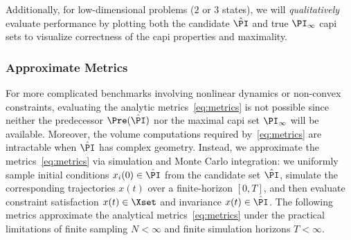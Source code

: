Additionally, for low-dimensional problems ($2$ or $3$ states), we will \textit{qualitatively} evaluate performance by plotting both the candidate $\hat{\PI}$ and true $\PI_\infty$ \ac{capi} sets to visualize correctness of the \ac{capi} properties and maximality. 

\subsubsection{Approximate Metrics}

For more complicated benchmarks involving nonlinear dynamics or non-convex constraints, evaluating the analytic metrics~\eqref{eq:metrics} is not possible since neither the predecessor $\Pre(\hat{\PI})$ nor the maximal \ac{capi} set $\PI_\infty$ will be available. Moreover, the volume computations required by~\eqref{eq:metrics} are intractable when $\hat{\PI}$ has complex geometry. Instead, we approximate the metrics~\eqref{eq:metrics} via simulation and Monte Carlo integration: we uniformly sample initial conditions $x_i(0) \in \hat{\PI}$ from the candidate set $\hat{\PI}$, simulate the corresponding trajectories $x(t)$ over a finite-horizon $[0,T]$, and then evaluate constraint satisfaction $x(t) \in \Xset$ and invariance $x(t) \in \hat\PI$. 
The following metrics approximate the analytical metrics~\eqref{eq:metrics} under the practical limitations of finite sampling $N < \infty$ and finite simulation horizons $T < \infty$. 

